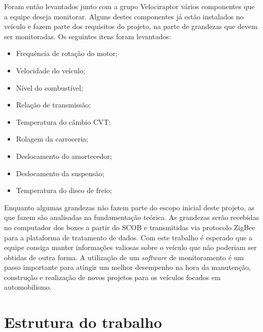 Foram então levantados junto com a grupo Velociraptor vários componentes que a equipe deseja monitorar. Alguns destes componentes já estão instalados no veículo e fazem parte dos requisitos do projeto, na parte de grandezas que devem ser monitoradas. Os seguintes itens foram levantados: 

\begin{itemize}
	\item Frequência de rotação do motor;
	\item Velocidade do veículo;
	\item Nível do combustível;
	\item Relação de transmissão;
	\item Temperatura do câmbio CVT;
	\item Rolagem da carroceria;
	\item Deslocamento do amortecedor;
	\item Deslocamento da suspensão;
	\item Temperatura do disco de freio;
\end{itemize}

Enquanto algumas grandezas não fazem parte do escopo inicial deste projeto, as que fazem são analisadas na fundamentação teórica. As grandezas serão recebidas no computador dos boxes a partir do SCOB e transmitidas via protocolo ZigBee para a plataforma de tratamento de dados. Com este trabalho é esperado que a equipe consiga manter informações valiosas sobre o veículo que não poderiam ser obtidas de outra forma. A utilização de um \textit{software} de monitoramento é um passo importante para atingir um melhor desempenho na hora da manutenção, construção e realização de novos projetos para os veículos focados em automobilismo.   

\section{Estrutura do trabalho}

